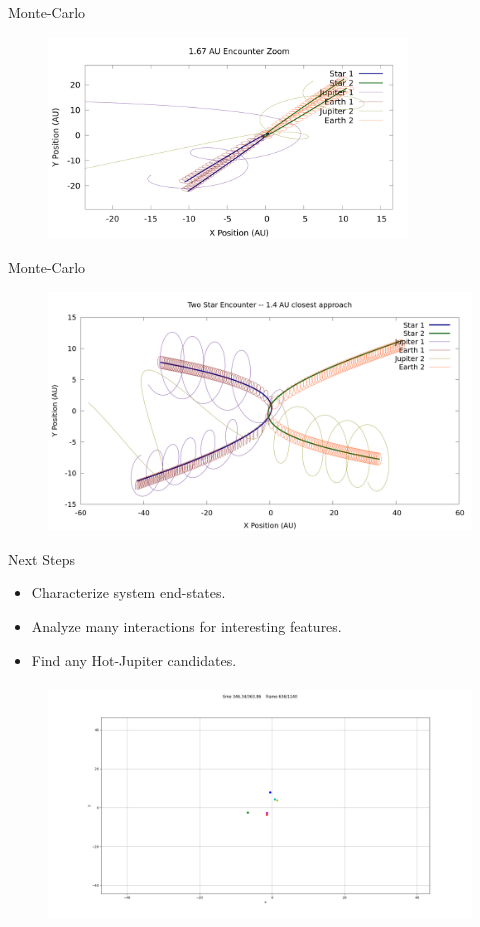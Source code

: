 \documentclass{beamer}
\begin{document}
\begin{frame}{Monte-Carlo}
    \begin{figure}
        \centering
        \includegraphics[width=3.75in]{1_67_AU_zoom}
    \end{figure}
\end{frame}

\begin{frame}{Monte-Carlo}
    \begin{figure}
        \centering
        \includegraphics[height=2.5in]{1.4AU/1_4_AU_encounter_plot}
    \end{figure}
\end{frame}

\begin{frame}{Next Steps}
    \begin{itemize}
        \item Characterize system end-states.
        \item Analyze many interactions for interesting features.
        \item Find any Hot-Jupiter candidates.
    \end{itemize}
    \begin{figure}
        \centering
        \includegraphics[height=2.5in]{anim_still}
    \end{figure}
\end{frame}

\begin{frame}
\end{frame}
\end{document}
